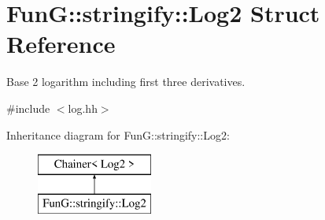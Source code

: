 \hypertarget{structFunG_1_1stringify_1_1Log2}{\section{Fun\-G\-:\-:stringify\-:\-:Log2 Struct Reference}
\label{structFunG_1_1stringify_1_1Log2}
}


Base 2 logarithm including first three derivatives.  




{\ttfamily \#include $<$log.\-hh$>$}

Inheritance diagram for Fun\-G\-:\-:stringify\-:\-:Log2\-:\begin{figure}[H]
\begin{center}
\leavevmode
\includegraphics[height=2.000000cm]{structFunG_1_1stringify_1_1Log2}
\end{center}
\end{figure}

